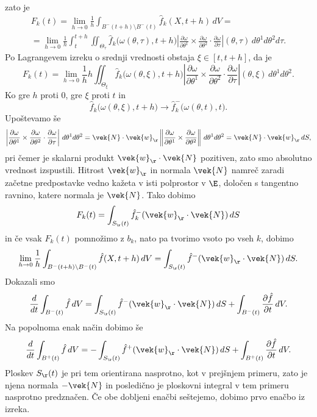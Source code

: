 	zato je
	\begin{multline*}
		F_k(t)=\lim_{h\to 0} \frac{1}{h}\int_{B^-(t+h)\setminus B^-(t)} \hat{f}_k(X,t+h)\,dV=\\
		=\lim_{h\to 0} \frac{1}{h}\int_{t}^{t+h}\iint_{\Theta_{\tau}}\hat{f}_k\big(\omega(\theta,\tau),t+h\big)
		\left|\frac{\partial\omega}{\partial\theta^1}\times\frac{\partial\omega}{\partial\theta^2}\cdot\frac{\partial\omega}{\partial\tau}\right|
		(\theta,\tau)\,d\theta^1 d\theta^2 d\tau.
	\end{multline*}
	Po Lagrangevem izreku o srednji vrednosti obstaja $\xi\in [t,t+h]$, da je
	\[
		F_k(t)=\lim_{h\to 0} \frac{1}{h}h\iint_{\Theta_{\xi}}\hat{f}_k\big(\omega(\theta,\xi),t+h\big)
		\left|\frac{\partial\omega}{\partial\theta^1}\times\frac{\partial\omega}{\partial\theta^2}\cdot\frac{\partial\omega}{\partial\tau}\right|
		(\theta,\xi)\,d\theta^1 d\theta^2.
	\]
	Ko gre $h$ proti $0$, gre $\xi$ proti $t$ in
	\[ \hat{f}_k\big(\omega(\theta,\xi),t+h\big)\to\hat{f}^-_k\big(\omega(\theta,t),t\big). \]
	Upoštevamo še
	\[
		\left|\frac{\partial\omega}{\partial\theta^1}\times\frac{\partial\omega}{\partial\theta^2}\cdot
		\frac{\partial\omega}{\partial\tau}\right|\,d\theta^1 d\theta^2=
		\vek{N}\cdot\vek{w}_{\r}
		\left\|\frac{\partial\omega}{\partial\theta^1}\times\frac{\partial\omega}{\partial\theta^2}\right\|\,d\theta^1 d\theta^2=
		\vek{N}\cdot\vek{w}_{\r}\,dS,
	\]
	pri čemer je skalarni produkt $\vek{w}_{\r}\cdot\vek{N}$ pozitiven, zato smo absolutno vrednost izspustili.
	Hitrost $\vek{w}_{\r}$ in normala $\vek{N}$ namreč zaradi začetne predpostavke vedno kažeta v isti polprostor v $\E$,
	določen s tangentno ravnino, katere normala je $\vek{N}$. Tako dobimo
	\[ F_k(t)=\int_{S_{\r}(t)}\hat{f}_k^-(\vek{w}_{\r}\cdot\vek{N})\,dS \]
	in če vsak $F_k(t)$ pomnožimo z $b_k$, nato pa tvorimo vsoto po vseh $k$, dobimo
	\[
		\lim_{h\to 0} \frac{1}{h}\int_{B^-(t+h)\setminus B^-(t)} \hat{f}(X,t+h)\,dV =
		\int_{S_{\r}(t)}\hat{f}^-(\vek{w}_{\r}\cdot\vek{N})\,dS.
	\]
	Dokazali smo
	\begin{equation} \label{e:vmrez}
		\frac{d}{dt}\int_{B^-(t)} \hat{f}\,dV =
		\int_{S_{\r}(t)}\hat{f}^-(\vek{w}_{\r}\cdot\vek{N})\,dS +
		\int_{B^-(t)} \frac{\partial\hat{f}}{\partial t}\,dV.
	\end{equation}
	Na popolnoma enak način dobimo še
	\begin{equation*}
		\frac{d}{dt}\int_{B^+(t)} \hat{f}\,dV =
		-\int_{S_{\r}(t)}\hat{f}^+(\vek{w}_{\r}\cdot\vek{N})\,dS +
		\int_{B^+(t)} \frac{\partial\hat{f}}{\partial t}\,dV.
	\end{equation*}
	Ploskev $S_{\r}(t)$ je pri tem orientirana nasprotno, kot v prejšnjem primeru,
	zato je njena normala $-\vek{N}$ in posledično je ploskovni integral v tem primeru
	nasprotno predznačen. Če obe dobljeni enačbi seštejemo, dobimo prvo enačbo
	iz izreka.
	
